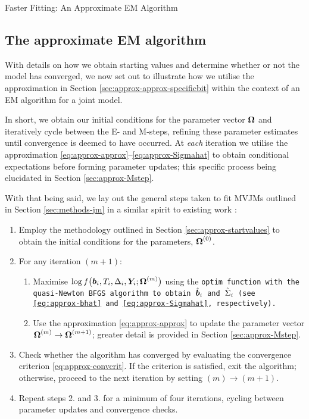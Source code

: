\begin{chapter}{\label{cha:approx}Faster Fitting: An Approximate EM Algorithm}
  \subsection{The approximate EM algorithm}\label{sec:approx-approxEMalg}
  With details on how we obtain starting values and determine whether or not the model has converged, we now set out to illustrate how we utilise the approximation in Section \ref{sec:approx-approx-specificbit} within the context of an EM algorithm for a joint model. 
  
  In short, we obtain our initial conditions for the parameter vector $\bm{\mathrm{\Omega}}$ and iteratively cycle between the E- and M-steps, refining these parameter estimates until convergence is deemed to have occurred. At \textit{each} iteration we utilise the approximation \eqref{eq:approx-approx}--\eqref{eq:approx-Sigmahat} to obtain conditional expectations before forming parameter updates; this specific process being elucidated in Section \ref{sec:approx-Mstep}. 
  
  With that being said, we lay out the general steps taken to fit MVJMs outlined in Section \ref{sec:methods-jm} in a similar spirit to existing work \citep{Bernhardt15, Murray2022, Murray2023}:
  \begin{enumerate}
      \item Employ the methodology outlined in Section \ref{sec:approx-startvalues} to obtain the initial conditions for the parameters, $\bm{\mathrm{\Omega}}^{(0)}$.
      \item For any iteration $(m+1)$:
      \begin{enumerate}[label=\roman*.]
          \item Maximise $\log f\big(\bm{b}_i,T_i,\Delta_i,\bm{Y}_i;\bm{\mathrm{\Omega}}^{(m)}\big)$ using the \tt{optim} function with the quasi-Newton BFGS algorithm to obtain $\hat{\bm{b}}_i$ and $\hat{\Sigma}_i$ (see \eqref{eq:approx-bhat} and \eqref{eq:approx-Sigmahat}, respectively).
          \item Use the approximation \eqref{eq:approx-approx} to update the parameter vector $\bm{\mathrm{\Omega}}^{(m)}\rightarrow\bm{\mathrm{\Omega}}^{(m+1)}$; greater detail is provided in Section \ref{sec:approx-Mstep}.
      \end{enumerate}
      \item Check whether the algorithm has converged by evaluating the convergence criterion \eqref{eq:approx-convcrit}. If the criterion is satisfied, exit the algorithm; otherwise, proceed to the next iteration by setting $(m)\rightarrow (m+1)$.
      \item Repeat steps 2. and 3. for a minimum of four iterations, cycling between parameter updates and convergence checks.
  \end{enumerate}
  

\end{chapter}
